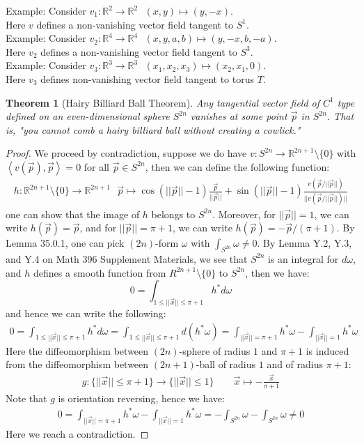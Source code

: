 \documentclass[15pt]{book}
\theoremstyle{break}
\theoremstyle{break}
\newtheorem{thm}{Theorem}[section]
\newcommand{\R}{\mathbb{R}}
\newcommand{\example}{\color{green}Example: \color{black}}
\begin{document}
\example Consider $v_1:\R^2 \to \R^2 \ \ \ (x,y)\mapsto (y,-x)$.\\
Here $v$ defines a non-vanishing vector field tangent to $S^1$.\\

\example Consider $v_2:\R^4 \to \R^4 \ \ \ (x,y,a,b)\mapsto(y,-x, b, -a)$.\\
Here $v_2$ defines a non-vanishing vector field tangent to $S^3$.\\

\example Consider $v_3:\R^3 \to \R^3 \ \ \ (x_1,x_2,x_3)\mapsto(x_2,x_1,0)$.\\
Here $v_3$ defines non-vanishing vector field tangent to torus $T$.\\


\begin{thm}[Hairy Billiard Ball Theorem]
Any tangential vector field of $C^1$ type defined on an even-dimensional sphere $S^{2n}$ vanishes at some point $\vec{p}$ in $S^{2n}$. That is, "you cannot comb a hairy billiard ball without creating a cowlick."
\end{thm}
\begin{proof}
We proceed by contradiction, suppose we do have $v:S^{2n} \to \R^{2n+1}\setminus \{0\}$ with $\left<v(\vec{p}), \vec{p}\right> = 0$ for all $\vec{p}\in S^{2n}$, then we can define the following function:
\begin{align*}
h: \R^{2n+1}\setminus \{0\} \to \R^{2n+1} \ \ \ \vec{p}\mapsto\cos(||\vec{p}||-1) \frac{\vec{p}}{||\vec{p}||} + \sin(||\vec{p}||-1) \frac{v(\vec{p}/||\vec{p}||)}{||v(\vec{p}/||\vec{p}||)||}
\end{align*}
one can show that the image of $h$ belongs to $S^{2n}$. Moreover, for $||\vec{p}|| = 1$, we can write $h(\vec{p}) = \vec{p}$, and for $||\vec{p}|| = \pi +1$, we can write $h(\vec{p}) = -\vec{p}/(\pi+1)$. By Lemma 35.0.1, one can pick $(2n)$-form $\omega$ with $\int_{S^{2n}}\omega \neq 0$. By Lemma Y.2, Y.3, and Y.4 on Math 396 Supplement Materials, we see that $S^{2n}$ is an integral for $d\omega$, and $h$ defines a smooth function from $R^{2n+1}\setminus \{0\}$ to $S^{2n}$, then we have: 
$$0 = \int_{1\leq ||\vec{x}|| \leq {\pi+1}} h^*d\omega $$ 
and hence we can write the following:
\begin{align*}
0 = \int_{1\leq ||\vec{x}|| \leq {\pi+1}} h^*d\omega = \int_{1\leq ||\vec{x}|| \leq \pi+1} d(h^*\omega) = \int_{||\vec{x}|| = \pi+1}h^*\omega - \int_{||\vec{x}||=1} h^*\omega
\end{align*}
Here the diffeomorphism between $(2n)$-sphere of radius $1$ and $\pi+1$ is induced from the diffeomorphism between $(2n+1)$-ball of radius $1$ and of radius $\pi+1$:
\begin{align*}
g: \{||\vec{x}||\leq \pi+1\} \to \{ ||\vec{x}||\leq 1\} \qquad \vec{x}\mapsto - \frac{\vec{x}}{\pi+1}
\end{align*}
Note that $g$ is orientation reversing, hence we have:
\begin{align*}
0 = \int_{||\vec{x}|| = \pi+1}h^*\omega - \int_{||\vec{x}||=1} h^*\omega  =-\int_{S^{2n}}\omega - \int_{S^{2n}}\omega   \neq 0 
\end{align*}
Here we reach a contradiction. 
\end{proof}
\end{document}
